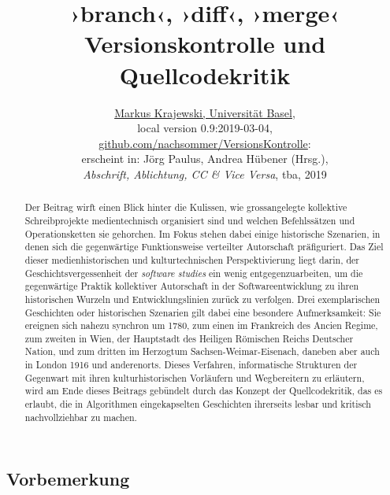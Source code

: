 \documentclass[a4paper,11pt]{article}
\date{}
\newcommand{\inanf}[1]{›#1‹}
\begin{document}
%
% 
\title{\Huge\inanf{branch}, \inanf{diff}, \inanf{merge}\\
\Large Versionskontrolle und Quellcodekritik}
\author{\href{http://gtm.mewi.unibas.ch}{Markus Krajewski, Universität Basel},\\[3mm]
local version 0.9:2019-03-04,\\
\href{https://github.com/nachsommer/VersionsKontrolle/tree/master/1.Fassung}{github.com/nachsommer/VersionsKontrolle}: \gitVer{}\\[3mm]
erscheint in: Jörg Paulus, Andrea Hübener (Hrsg.),\\
\emph{Abschrift, Ablichtung, CC \& Vice Versa}, tba, 2019}
\maketitle
\tableofcontents
%
\begin{abstract}
\noindent Der Beitrag wirft einen Blick hinter die Kulissen, wie grossangelegte kollektive Schreibprojekte medientechnisch organisiert sind und welchen Befehlssätzen und Operationsketten sie gehorchen. Im Fokus stehen dabei einige historische Szenarien, in denen sich die gegenwärtige Funktionsweise verteilter Autorschaft präfiguriert. Das Ziel dieser medienhistorischen und kulturtechnischen Perspektivierung liegt darin, der Geschichtsvergessenheit der \emph{software studies} ein wenig entgegenzuarbeiten, um die gegenwärtige Praktik kollektiver Autorschaft in der Softwareentwicklung zu ihren historischen Wurzeln und Entwicklungslinien zurück zu verfolgen. Drei exemplarischen Geschichten oder historischen Szenarien gilt dabei eine besondere Aufmerksamkeit: Sie ereignen sich nahezu synchron um 1780, zum einen im Frankreich des Ancien Regime, zum zweiten in Wien, der Hauptstadt des Heiligen Römischen Reichs Deutscher Nation, und zum dritten im Herzogtum Sachsen-Weimar-Eisenach, daneben aber auch in London 1916 und anderenorts. Dieses Verfahren, informatische Strukturen der Gegenwart mit ihren kulturhistorischen Vorläufern und Wegbereitern zu erläutern, wird am Ende dieses Beitrags gebündelt durch das Konzept der Quellcodekritik, das es erlaubt, die in Algorithmen eingekapselten Geschichten ihrerseits lesbar und kritisch nachvollziehbar zu machen. 
\end{abstract}


\subsection*{Vorbemerkung}
\end{document}
